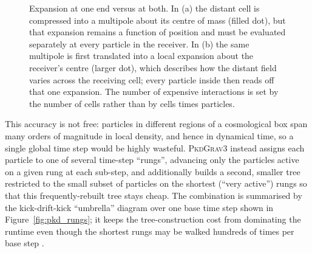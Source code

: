 \documentclass{report}
\begin{document}
\begin{figure}[htbp]
  \caption[Barnes--Hut versus FMM expansion]{%
    Expansion at one end versus at both. In (a) the distant cell is compressed
    into a multipole about its centre of mass (filled dot), but that expansion
    remains a function of position and must be evaluated separately at every
    particle in the receiver. In (b) the same multipole is first translated into
    a local expansion about the receiver's centre (larger dot), which describes
    how the distant field varies across the receiving cell; every particle
    inside then reads off that one expansion. The number of expensive
    interactions is set by the number of cells rather than by cells times
    particles.}
  \label{fig:bh-vs-fmm}
\end{figure}

This accuracy is not free: particles in different regions of a cosmological box span many orders of magnitude in local density, and hence in dynamical time, so a single global time step would be highly wasteful. \textsc{PkdGrav3} instead assigns each particle to one of several time-step ``rungs'', advancing only the particles active on a given rung at each sub-step, and additionally builds a second, smaller tree restricted to the small subset of particles on the shortest (``very active'') rungs so that this frequently-rebuilt tree stays cheap. The combination is summarised by the kick-drift-kick ``umbrella'' diagram over one base time step shown in Figure~\ref{fig:pkd_rungs}; it keeps the tree-construction cost from dominating the runtime even though the shortest rungs may be walked hundreds of times per base step \cite{potter_pkdgrav3_2016}.
\end{document}
